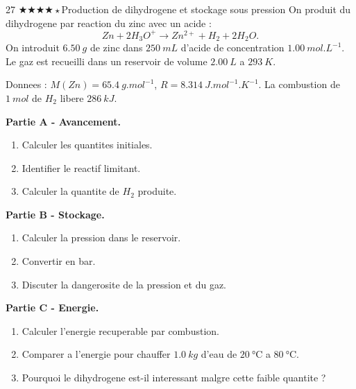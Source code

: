 \documentclass[11pt,a4paper]{article}
\newcommand{\difffour}{\(\bigstar\bigstar\bigstar\bigstar\star\)}
\begin{document}
\begin{probleme}{27 \difffour}{Production de dihydrogene et stockage sous pression}
On produit du dihydrogene par reaction du zinc avec un acide :
\[
Zn+2H_3O^+\rightarrow Zn^{2+}+H_2+2H_2O.
\]
On introduit \(\SI{6.50}{g}\) de zinc dans \(\SI{250}{mL}\) d'acide de concentration \(\SI{1.00}{mol.L^{-1}}\). Le gaz est recueilli dans un reservoir de volume \(\SI{2.00}{L}\) a \(\SI{293}{K}\).

Donnees : \(M(Zn)=\SI{65.4}{g.mol^{-1}}\), \(R=\SI{8.314}{J.mol^{-1}.K^{-1}}\). La combustion de \(\SI{1}{mol}\) de \(H_2\) libere \(\SI{286}{kJ}\).

\textbf{Partie A - Avancement.}
\begin{enumerate}
\item Calculer les quantites initiales.
\item Identifier le reactif limitant.
\item Calculer la quantite de \(H_2\) produite.
\end{enumerate}

\textbf{Partie B - Stockage.}
\begin{enumerate}[resume]
\item Calculer la pression dans le reservoir.
\item Convertir en bar.
\item Discuter la dangerosite de la pression et du gaz.
\end{enumerate}

\textbf{Partie C - Energie.}
\begin{enumerate}[resume]
\item Calculer l'energie recuperable par combustion.
\item Comparer a l'energie pour chauffer \(\SI{1.0}{kg}\) d'eau de \(\SI{20}{\celsius}\) a \(\SI{80}{\celsius}\).
\item Pourquoi le dihydrogene est-il interessant malgre cette faible quantite ?
\end{enumerate}
\end{probleme}
\end{document}
